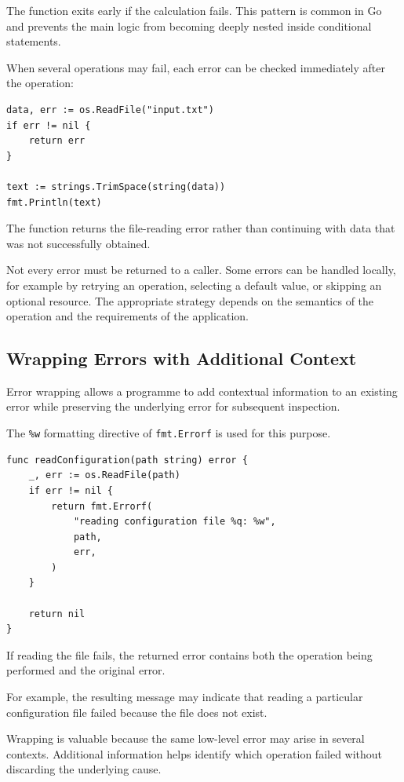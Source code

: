 The function exits early if the calculation fails. This pattern is common in Go and prevents the main logic from becoming deeply nested inside conditional statements.

When several operations may fail, each error can be checked immediately after the operation:

\begin{lstlisting}
data, err := os.ReadFile("input.txt")
if err != nil {
    return err
}

text := strings.TrimSpace(string(data))
fmt.Println(text)
\end{lstlisting}

The function returns the file-reading error rather than continuing with data that was not successfully obtained.

Not every error must be returned to a caller. Some errors can be handled locally, for example by retrying an operation, selecting a default value, or skipping an optional resource. The appropriate strategy depends on the semantics of the operation and the requirements of the application.

\subsection{Wrapping Errors with Additional Context}

Error wrapping allows a programme to add contextual information to an existing error while preserving the underlying error for subsequent inspection.

The \texttt{\%w} formatting directive of \texttt{fmt.Errorf} is used for this purpose.

\begin{lstlisting}
func readConfiguration(path string) error {
    _, err := os.ReadFile(path)
    if err != nil {
        return fmt.Errorf(
            "reading configuration file %q: %w",
            path,
            err,
        )
    }

    return nil
}
\end{lstlisting}

If reading the file fails, the returned error contains both the operation being performed and the original error.

For example, the resulting message may indicate that reading a particular configuration file failed because the file does not exist.

Wrapping is valuable because the same low-level error may arise in several contexts. Additional information helps identify which operation failed without discarding the underlying cause.

